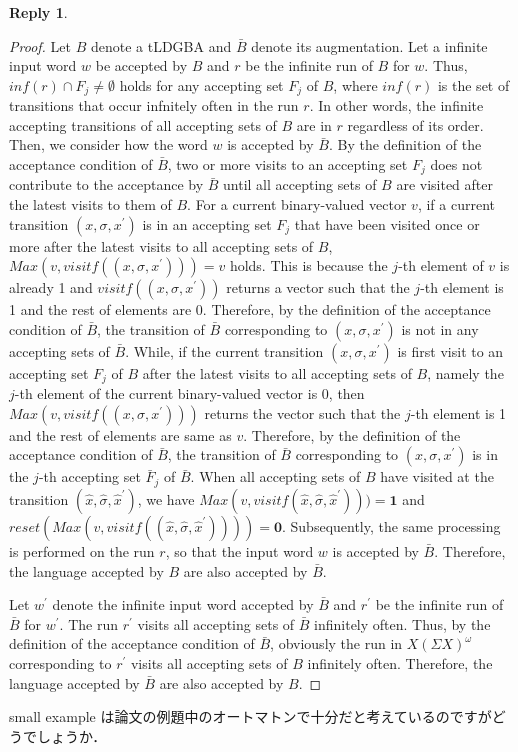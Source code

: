 \documentclass[10 pt, dvipdfmx]{article}
\theoremstyle{definition}
\newtheorem{review point}{Review Point}[section]
\newtheorem*{reply}{Reply}
\begin{document}
\begin{reply}
  \begin{proof}
    Let $B$ denote a tLDGBA and $\bar{B}$ denote its augmentation. Let a infinite input word $w$ be accepted by $B$ and $r$ be the infinite run of $B$ for $w$. Thus, $inf(r) \cap F_j \neq \emptyset$ holds for any accepting set $F_j$ of $B$, where $inf(r)$ is the set of transitions that occur infnitely often in the run $r$. In other words, the infinite accepting transitions of all accepting sets of $B$ are in $r$ regardless of its order. Then, we consider how the word $w$ is accepted by $\bar{B}$. By the definition of the acceptance condition of $\bar{B}$, two or more visits to an accepting set $F_j$ does not contribute to the acceptance by $\bar{B}$ until all accepting sets of $B$ are visited after the latest visits to them of $B$. For a current binary-valued vector $v$, if a current transition $(x,\sigma,x^{\prime})$ is in an accepting set $F_j$ that have been visited once or more after the latest visits to all accepting sets of $B$, $Max(v, visitf((x,\sigma,x^{\prime}))) = v$ holds. This is because the $j$-th element of $v$ is already 1 and $visitf((x,\sigma,x^{\prime}))$ returns a vector such that the $j$-th element is 1 and the rest of elements are 0. Therefore, by the definition of the acceptance condition of $\bar{B}$, the transition of $\bar{B}$ corresponding to $(x,\sigma,x^{\prime})$ is not in any accepting sets of $\bar{B}$.
    While, if the current transition $(x,\sigma,x^{\prime})$ is first visit to an accepting set $F_j$ of $B$ after the latest visits to all accepting sets of $B$, namely the $j$-th element of the current binary-valued vector is $0$, then $Max(v, visitf((x,\sigma,x^{\prime})))$ returns the vector such that the $j$-th element is 1 and the rest of elements are same as $v$. Therefore, by the definition of the acceptance condition of $\bar{B}$, the transition of $\bar{B}$ corresponding to $(x,\sigma,x^{\prime})$ is in the $j$-th accepting set $\bar{F}_j$ of $\bar{B}$.
    When all accepting sets of $B$ have visited at the transition $(\hat{x},\hat{\sigma},\hat{x}^{\prime})$, we have $Max(v, visitf(\hat{x},\hat{\sigma},\hat{x}^{\prime}))) = \bm{1}$ and $reset(Max(v, visitf((\hat{x},\hat{\sigma},\hat{x}^{\prime})))) = \bm{0}$. Subsequently, the same processing is performed on the run $r$, so that the input word $w$ is accepted by $\bar{B}$. Therefore, the language accepted by $B$ are also accepted by $\bar{B}$.

    Let $w^{\prime}$ denote the infinite input word accepted by $\bar{B}$ and $r^{\prime}$ be the infinite run of $\bar{B}$ for $w^{\prime}$. The run $r^{\prime}$ visits all accepting sets of $\bar{B}$ infinitely often. Thus, by the definition of the acceptance condition of $\bar{B}$, obviously the run in $X(\Sigma X)^{\omega}$ corresponding to $r^{\prime}$ visits all accepting sets of $B$ infinitely often. Therefore, the language accepted by $\bar{B}$ are also accepted by $B$.
  \end{proof}

  small example は論文の例題中のオートマトンで十分だと考えているのですがどうでしょうか．
\end{reply}
\end{document}
